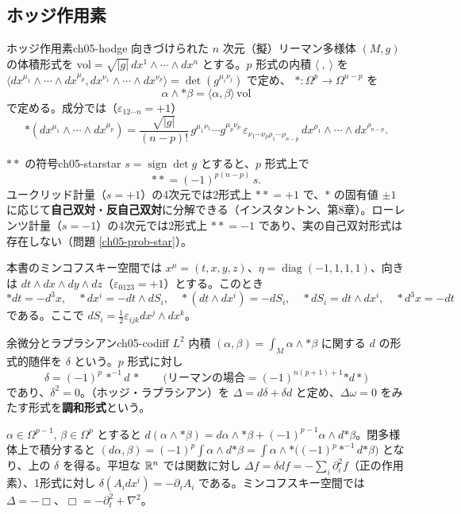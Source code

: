 \subsection{ホッジ作用素}
\begin{mydef}{ホッジ作用素}{ch05-hodge}
向きづけられた $n$ 次元（擬）リーマン多様体 $(M,g)$ の体積形式を $\mathrm{vol}=\sqrt{\lvert g\rvert}\,dx^1\wedge\cdots\wedge dx^n$ とする。$p$ 形式の内積 $\langle\ ,\ \rangle$ を $\langle dx^{\mu_1}\wedge\cdots\wedge dx^{\mu_p},dx^{\nu_1}\wedge\cdots\wedge dx^{\nu_p}\rangle=\det(g^{\mu_i\nu_j})$ で定め、 ${*}\colon\Omega^p\to\Omega^{n-p}$ を
\[
\alpha\wedge{*\beta}=\langle\alpha,\beta\rangle\,\mathrm{vol}
\]
で定める。成分では（$\varepsilon_{12\cdots n}=+1$）
\[
{*}(dx^{\mu_1}\wedge\cdots\wedge dx^{\mu_p})=\frac{\sqrt{\lvert g\rvert}}{(n-p)!}\,g^{\mu_1\nu_1}\cdots g^{\mu_p\nu_p}\,\varepsilon_{\nu_1\cdots\nu_p\rho_1\cdots\rho_{n-p}}\,dx^{\rho_1}\wedge\cdots\wedge dx^{\rho_{n-p}} .
\]
\end{mydef}

\begin{myprop}{${**}$ の符号}{ch05-starstar}
$s=\operatorname{sign}\det g$ とすると、$p$ 形式上で
\[
{**}=(-1)^{p(n-p)}\,s .
\]
ユークリッド計量（$s=+1$）の4次元では2形式上 ${**}=+1$ で、${*}$ の固有値 $\pm1$ に応じて\textbf{自己双対}・\textbf{反自己双対}に分解できる（インスタントン、第8章）。ローレンツ計量（$s=-1$）の4次元では2形式上 ${**}=-1$ であり、実の自己双対形式は存在しない（問題 \ref{ch05-prob-star}）。
\end{myprop}

本書のミンコフスキー空間では $x^\mu=(t,x,y,z)$、$\eta=\operatorname{diag}(-1,1,1,1)$、向きは $dt\wedge dx\wedge dy\wedge dz$（$\varepsilon_{0123}=+1$）とする。このとき
\[
{*}dt=-d^3x,\quad {*}dx^i=-dt\wedge dS_i,\quad {*}(dt\wedge dx^i)=-dS_i,\quad {*}dS_i=dt\wedge dx^i,\quad {*}d^3x=-dt
\]
である。ここで $dS_i=\tfrac12\varepsilon_{ijk}dx^j\wedge dx^k$。

\begin{mydef}{余微分とラプラシアン}{ch05-codiff}
$L^2$ 内積 $(\alpha,\beta)=\int_M\alpha\wedge{*\beta}$ に関する $d$ の形式的随伴を $\delta$ という。$p$ 形式に対し
\[
\delta=(-1)^p\,{*}^{-1}d\,{*}\qquad\bigl(\text{リーマンの場合}=(-1)^{n(p+1)+1}{*d*}\bigr)
\]
であり、$\delta^2=0$。（ホッジ・ラプラシアン）を $\Delta=d\delta+\delta d$ と定め、$\Delta\omega=0$ をみたす形式を\textbf{調和形式}という。
\end{mydef}
\begin{note}
$\alpha\in\Omega^{p-1}$, $\beta\in\Omega^p$ とすると $d(\alpha\wedge{*\beta})=d\alpha\wedge{*\beta}+(-1)^{p-1}\alpha\wedge d{*\beta}$。閉多様体上で積分すると $(d\alpha,\beta)=(-1)^p\int\alpha\wedge d{*\beta}=\int\alpha\wedge{*}\bigl((-1)^p{*}^{-1}d{*\beta}\bigr)$ となり、上の $\delta$ を得る。平坦な $\mathbb{R}^n$ では関数に対し $\Delta f=\delta df=-\sum_i\partial_i^2f$（正の作用素）、1形式に対し $\delta(A_idx^i)=-\partial_iA_i$ である。ミンコフスキー空間では $\Delta=-\Box$、$\Box=-\partial_t^2+\nabla^2$。
\end{note}

